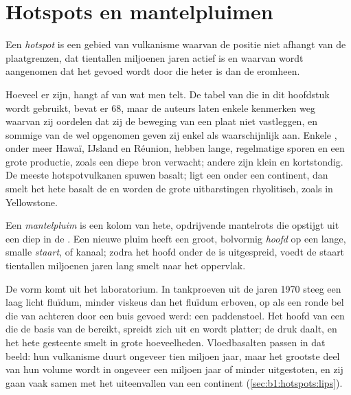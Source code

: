 \section{Hotspots en mantelpluimen}\label{sec:b1:hotspots:plumes}

\begin{definition}[Hotspot]\label{def:b1:hotspots:hotspot}
Een \emph{hotspot} is een gebied van vulkanisme waarvan de positie niet afhangt van de plaatgrenzen, dat tientallen miljoenen jaren actief is en waarvan wordt aangenomen dat het gevoed wordt door  die heter is dan de  eromheen.
\end{definition}

Hoeveel  er zijn, hangt af van wat men telt. De tabel van  die in dit hoofdstuk wordt gebruikt, bevat er 68, maar de auteurs laten enkele kenmerken weg waarvan zij oordelen dat zij de beweging van een plaat niet vastleggen, en sommige van de wel opgenomen geven zij enkel als waarschijnlijk aan. Enkele , onder meer Hawaï, IJsland en Réunion, hebben lange, regelmatige sporen en een grote productie, zoals een diepe bron verwacht; andere zijn klein en kortstondig. De meeste hotspotvulkanen spuwen basalt; ligt een  onder een continent, dan smelt het hete basalt de  en worden de grote uitbarstingen rhyolitisch, zoals in Yellowstone.

\begin{definition}[Mantelpluim]\label{def:b1:hotspots:plume}
Een \emph{mantelpluim} is een kolom van hete, opdrijvende mantelrots die opstijgt uit een  diep in de . Een nieuwe pluim heeft een groot, bolvormig \emph{hoofd} op een lange, smalle \emph{staart}, of kanaal; zodra het hoofd onder de  is uitgespreid, voedt de staart tientallen miljoenen jaren lang smelt naar het oppervlak.
\end{definition}

De vorm komt uit het laboratorium. In tankproeven uit de jaren 1970 steeg een laag licht fluïdum, minder viskeus dan het fluïdum erboven, op als een ronde bel die van achteren door een buis gevoed werd: een paddenstoel. Het hoofd van een  die de basis van de  bereikt, spreidt zich uit en wordt platter; de druk daalt, en het hete gesteente smelt in grote hoeveelheden. Vloedbasalten passen in dat beeld: hun vulkanisme duurt ongeveer tien miljoen jaar, maar het grootste deel van hun volume wordt in ongeveer een miljoen jaar of minder uitgestoten, en zij gaan vaak samen met het uiteenvallen van een continent (\cref{sec:b1:hotspots:lips}).

